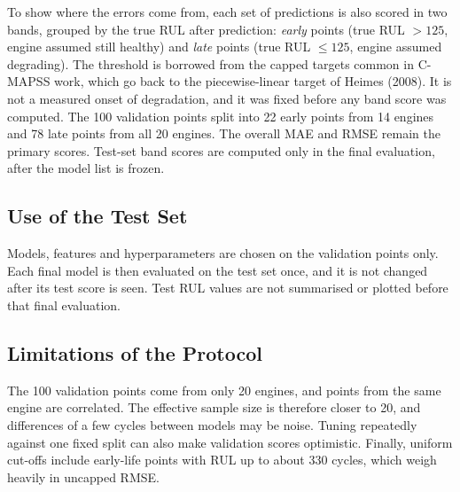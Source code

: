 To show where the errors come from, each set of predictions is also scored in
two bands, grouped by the true RUL after prediction: \emph{early} points
(true RUL $> 125$, engine assumed still healthy) and \emph{late} points (true
RUL $\le 125$, engine assumed degrading). The threshold is borrowed from the
capped targets common in C-MAPSS work, which go back to the piecewise-linear
target of Heimes (2008). It is not a measured onset of degradation, and it was
fixed before any band score was computed. The 100 validation points split
into 22 early points from 14 engines and 78 late points from all 20 engines.
The overall MAE and RMSE remain the primary scores. Test-set band scores are
computed only in the final evaluation, after the model list is frozen.

\subsection{Use of the Test Set}

Models, features and hyperparameters are chosen on the validation points
only. Each final model is then evaluated on the test set once, and it is not
changed after its test score is seen. Test RUL values are not summarised or
plotted before that final evaluation.

\subsection{Limitations of the Protocol}

The 100 validation points come from only 20 engines, and points from the same
engine are correlated. The effective sample size is therefore closer to 20,
and differences of a few cycles between models may be noise. Tuning
repeatedly against one fixed split can also make validation scores
optimistic. Finally, uniform cut-offs include early-life points with RUL up to
about 330 cycles, which weigh heavily in uncapped RMSE.
